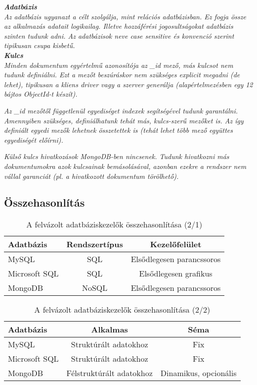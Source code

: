 \noindent\textit{\textbf{Adatbázis}}\\

\textit{Az adatbázis ugyanazt a célt szolgálja, mint relációs adatbázisban. Ez fogja össze az alkalmazás adatait logikailag. Illetve hozzáférési jogosultságokat adatbázis szinten tudunk adni. Az adatbázisok neve case sensitive és konvenció szerint tipikusan csupa kisbetű.}\\

\noindent\textit{\textbf{Kulcs}}\\

\textit{Minden dokumentum egyértelmű azonosítója az \_id mező, más kulcsot nem tudunk definiálni. Ezt a mezőt beszúráskor nem szükséges explicit megadni (de lehet), tipikusan a kliens driver vagy a szerver generálja (alapértelmezésben egy 12 bájtos ObjectId-t készít).}

\textit{Az \_id mezőtől függetlenül egyediséget indexek segítségével tudunk garantálni. \newline Amennyiben szükséges, definiálhatunk tehát más, kulcs-szerű mezőket is. Az így definiált egyedi mezők lehetnek összetettek is (tehát lehet több mező együttes egyediségét előírni).}

\textit{Külső kulcs hivatkozások MongoDB-ben nincsenek. Tudunk hivatkozni más dokumentumokra azok kulcsainak bemásolásával, azonban ezekre a rendszer nem vállal garanciát (pl. a hivatkozott dokumentum törölhető).}

\subsection{Összehasonlítás}

\begin{table}[h]
\centering
\caption{A felvázolt adatbáziskezelők összehasonlítása (2/1)}
\label{tab:minta}
\begin{tabular}{|l|c|c|}
\hline
Adatbázis & Rendszertípus &  Kezelőfelület\\
\hline
MySQL & SQL & Elsődlegesen parancssoros\\
\hline
Microsoft SQL & SQL & Elsődlegesen grafikus\\
\hline
MongoDB & NoSQL & Elsődlegesen parancssoros\\
\hline
\end{tabular}
\end{table}

\begin{table}[h]
\centering
\caption{A felvázolt adatbáziskezelők összehasonlítása (2/2)}
\label{tab:minta}
\begin{tabular}{|l|c|c|}
\hline
Adatbázis & Alkalmas &  Séma\\
\hline
MySQL & Struktúrált adatokhoz & Fix\\
\hline
Microsoft SQL & Struktúrált adatokhoz & Fix\\
\hline
MongoDB & Félstruktúrált adatokhoz & Dinamikus, opcionális\\
\hline
\end{tabular}
\end{table}